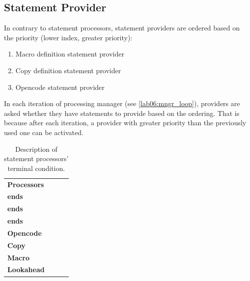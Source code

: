 \subsection{Statement Provider}
\label{lab06:sect_prov}

In contrary to statement processors, statement providers are ordered based on the priority (lower index, greater priority):

\begin{enumerate}
	\item Macro definition statement provider
	\item Copy definition statement provider
	\item Opencode statement provider
\end{enumerate}

In each iteration of processing manager (see \cref{lab06:mngr_loop}), providers are asked whether they have statements to provide based on the ordering. That is because after each iteration, a provider with greater priority than the previously used one can be activated. 


\begin{table}
	\centering
	\begin{tabular}{@{}p{}ccc@{}}
		\textbf{Processors} & \thead{\textbf{Macro provider} \\ \textbf{ends}} & \thead{\textbf{Copy provider} \\ \textbf{ends}} & \thead{\textbf{Opencode provider} \\ \textbf{ends}} \\ \toprule
		\textbf{Opencode}   &                      \cont                       &                      \cont                      &                        \fin                         \\
		\textbf{Copy}       &                      \cont                       &                      \cont                      &                        \fin                         \\
		\textbf{Macro}      &                       \fin                       &                      \cont                      &                        \fin                         \\
		\textbf{Lookahead}  &                       \fin                       &                      \cont                      &                        \fin                         \\ \bottomrule
	\end{tabular}
	\caption{Description of statement processors' terminal condition.}
	\label{tab06:term_cond}
\end{table}

